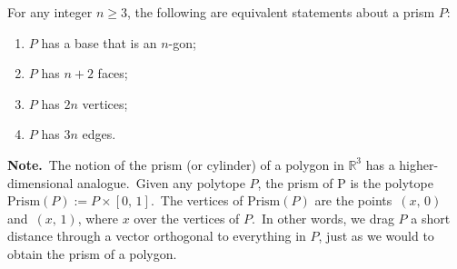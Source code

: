 \documentclass[12pt]{article}
\theoremstyle{definition}
\begin{document}
For any integer $n \ge 3$, the following are equivalent statements about a prism $P$:

\begin{enumerate}
\item $P$ has a base that is an $n$-gon;
\item $P$ has $n+2$ faces;
\item $P$ has $2n$ vertices;
\item $P$ has $3n$ edges.
\end{enumerate}

\textbf{Note.}\, The notion of the prism (or cylinder) of a polygon in $\mathbb{R}^3$ has a higher-dimensional analogue.\, Given any polytope $P$, the
prism of P is the polytope\, $\mbox{Prism}(P) := P\!\times\![0,\,1]$.\, The
vertices of $\mbox{Prism}(P)$ are the points\, $(x,\,0)$ and\, $(x,\,1)$, where
$x$  over the vertices of $P$.\, In other words, we drag
$P$ a short distance through a vector orthogonal to everything
in $P$, just as we would to obtain the prism of a polygon.
\end{document}
